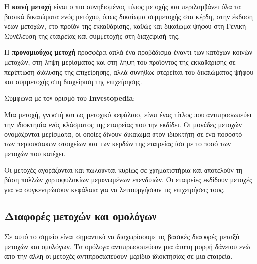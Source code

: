 Η \textbf{κοινή μετοχή} είναι ο πιο συνηθισμένος τύπος μετοχής και περιλαμβάνει όλα τα βασικά δικαιώματα ενός μετόχου, όπως δικαίωμα συμμετοχής στα κέρδη,
στην έκδοση νέων μετοχών, στο προϊόν της εκκαθάρισης, καθώς και δικαίωμα ψήφου στη Γενική Συνέλευση της εταιρείας και συμμετοχής στη διαχείρισή της.

Η \textbf{προνομιούχος μετοχή} προσφέρει απλά ένα προβάδισμα έναντι των κατόχων κοινών μετοχών, στη λήψη μερίσματος και στη λήψη του προϊόντος της εκκαθάρισης
σε περίπτωση διάλυσης της επιχείρησης, αλλά συνήθως στερείται του δικαιώματος ψήφου και συμμετοχής στη διαχείριση της επιχείρησης.

Σύμφωνα με τον ορισμό του \textbf{Investopedia}:

Μια μετοχή, γνωστή και ως μετοχικό κεφάλαιο, είναι ένας τίτλος που αντιπροσωπεύει την ιδιοκτησία ενός κλάσματος της εταιρείας που την εκδίδει.
Οι μονάδες μετοχών ονομάζονται μερίσματα, οι οποίες δίνουν δικαίωμα στον ιδιοκτήτη σε ένα ποσοστό των περιουσιακών στοιχείων 
και των κερδών της εταιρείας ίσο με το ποσό των μετοχών που κατέχει.

Οι μετοχές αγοράζονται και πωλούνται κυρίως σε χρηματιστήρια και αποτελούν τη βάση πολλών χαρτοφυλακίων μεμονωμένων επενδυτών.
Οι εταιρείες εκδίδουν μετοχές για να συγκεντρώσουν κεφάλαια για να λειτουργήσουν τις επιχειρήσεις τους.

\subsection{Διαφορές μετοχών και ομολόγων}

Σε αυτό το σημείο είναι σημαντικό να διαχωρίσουμε τις βασικές διαφορές μεταξύ μετοχών και ομολόγων.
Τα ομόλογα αντιπρωσοπεύουν μια άτυπη μορφή δάνειου ενώ απο την άλλη οι μετοχές αντιπροσωπεύουν μερίδιο ιδιοκτησίας σε μια εταιρεία.

